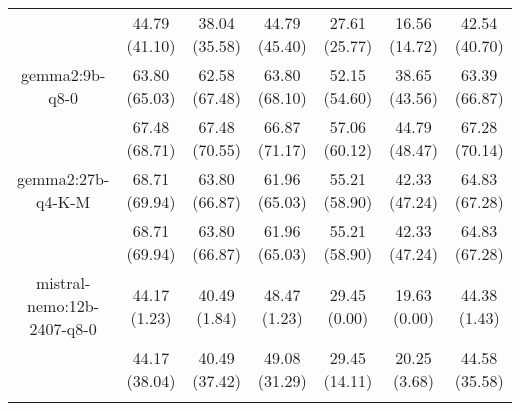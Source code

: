 \begin{table}[]
{\begin{tabular}{ccccccc}
      \multicolumn{1}{c|}{} & 44.79 (41.10) & 38.04 (35.58) & \multicolumn{1}{c|}{44.79 (45.40)} & 27.61 (25.77) & \multicolumn{1}{c|}{16.56 (14.72)} & 42.54 (40.70) \\
      \cline{1-7}


      \multicolumn{1}{c|}{gemma2:9b-q8-0} & 63.80 (65.03) & 62.58 (67.48) & \multicolumn{1}{c|}{63.80 (68.10)} & 52.15 (54.60) & \multicolumn{1}{c|}{38.65 (43.56)} & 63.39 (66.87) \\



      \multicolumn{1}{c|}{} & 67.48 (68.71) & 67.48 (70.55) & \multicolumn{1}{c|}{66.87 (71.17)} & 57.06 (60.12) & \multicolumn{1}{c|}{44.79 (48.47)} & 67.28 (70.14) \\
      \cline{1-7}


      \multicolumn{1}{c|}{gemma2:27b-q4-K-M} & 68.71 (69.94) & 63.80 (66.87) & \multicolumn{1}{c|}{61.96 (65.03)} & 55.21 (58.90) & \multicolumn{1}{c|}{42.33 (47.24)} & 64.83 (67.28) \\



      \multicolumn{1}{c|}{} & 68.71 (69.94) & 63.80 (66.87) & \multicolumn{1}{c|}{61.96 (65.03)} & 55.21 (58.90) & \multicolumn{1}{c|}{42.33 (47.24)} & 64.83 (67.28) \\
      \cline{1-7}


      \multicolumn{1}{c|}{mistral-nemo:12b-2407-q8-0} & 44.17 (1.23) & 40.49 (1.84) & \multicolumn{1}{c|}{48.47 (1.23)} & 29.45 (0.00) & \multicolumn{1}{c|}{19.63 (0.00)} & 44.38 (1.43) \\



      \multicolumn{1}{c|}{} & 44.17 (38.04) & 40.49 (37.42) & \multicolumn{1}{c|}{49.08 (31.29)} & 29.45 (14.11) & \multicolumn{1}{c|}{20.25 (3.68)} & 44.58 (35.58) \\
      \cline{1-7}

      \\ \hline
    \end{tabular}%
  }
\end{table}